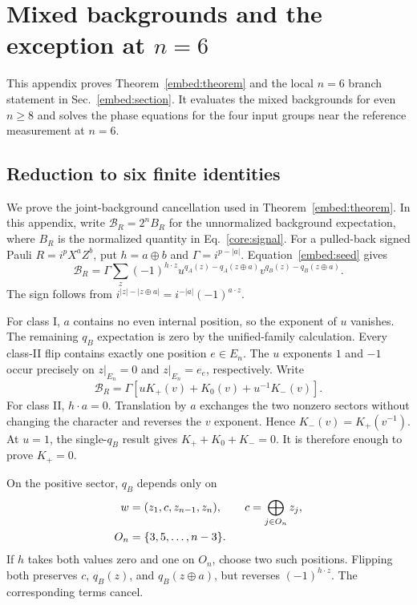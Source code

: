 \section{Mixed backgrounds and the exception at \texorpdfstring{$n=6$}{n=6}}
\label{embed:appendix}

This appendix proves Theorem~\ref{embed:theorem} and the local $n=6$ branch statement in Sec.~\ref{embed:section}. It evaluates the mixed backgrounds for even $n\ge8$ and solves the phase equations for the four input groups near the reference measurement at $n=6$.

\subsection{Reduction to six finite identities}
\label{embed:app-mixed}

We prove the joint-background cancellation used in Theorem~\ref{embed:theorem}. In this appendix, write $\mathcal B_R=2^n B_R$ for the unnormalized background expectation, where $B_R$ is the normalized quantity in Eq.~\eqref{core:signal}. For a pulled-back signed Pauli $R=i^pX^aZ^b$, put $h=a\oplus b$ and $\Gamma=i^{p-|a|}$. Equation~\eqref{embed:seed} gives
\begin{equation}
 \mathcal B_R=\Gamma\sum_z(-1)^{h\cdot z}
 u^{q_A(z)-q_A(z\oplus a)}
 v^{q_B(z)-q_B(z\oplus a)}.
 \label{embed:background-sum}
\end{equation}
The sign follows from
$i^{|z|-|z\oplus a|}=i^{-|a|}(-1)^{a\cdot z}$.

For class I, $a$ contains no even internal position, so the exponent of $u$ vanishes. The remaining $q_B$ expectation is zero by the unified-family calculation. Every class-II flip contains exactly one position $e\in E_n$. The $u$ exponents $1$ and $-1$ occur precisely on $z|_{E_n}=0$ and $z|_{E_n}=e_e$, respectively. Write
\begin{equation}
 \mathcal B_R=\Gamma\left[uK_+(v)+K_0(v)+u^{-1}K_-(v)\right].
 \label{embed:sectors}
\end{equation}
For class II, $h\cdot a=0$. Translation by $a$ exchanges the two nonzero sectors without changing the character and reverses the $v$ exponent. Hence
$K_-(v)=K_+(v^{-1})$. At $u=1$, the single-$q_B$ result gives $K_++K_0+K_-=0$. It is therefore enough to prove $K_+=0$.

On the positive sector, $q_B$ depends only on
\begin{align}
 w&=(z_1,c,z_{n-1},z_n),\qquad c=\bigoplus_{j\in O_n}z_j,\notag\\
 O_n&=\{3,5,\ldots,n-3\}.
 \label{embed:four-sector-bits}
\end{align}
If $h$ takes both values zero and one on $O_n$, choose two such positions. Flipping both preserves $c$, $q_B(z)$, and $q_B(z\oplus a)$, but reverses $(-1)^{h\cdot z}$. The corresponding terms cancel.

